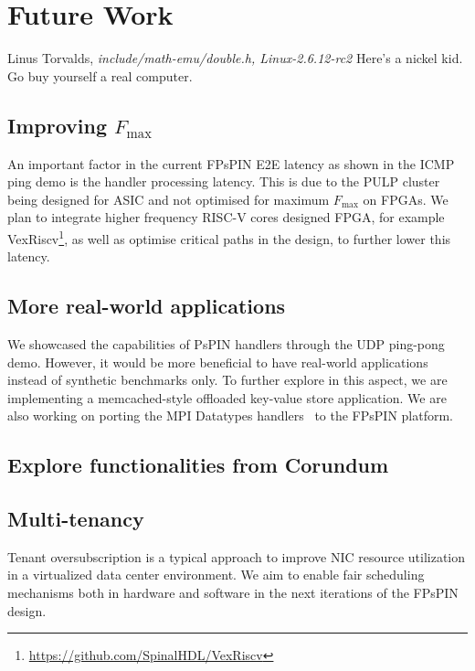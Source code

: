 \chapter{Future Work}
\begin{chapquote}{Linus Torvalds, \textit{include/math-emu/double.h, Linux-2.6.12-rc2}}
Here's a nickel kid.  Go buy yourself a real computer.
\end{chapquote}

\section{Improving $F_{\text{max}}$} \label{sec:improving-fmax}

An important factor in the current FPsPIN E2E latency as shown in the ICMP ping demo is the handler processing latency.  This is due to the PULP cluster being designed for ASIC and not optimised for maximum $F_{\text{max}}$ on FPGAs.  We plan to integrate higher frequency RISC-V cores designed FPGA, for example VexRiscv\footnote{\url{https://github.com/SpinalHDL/VexRiscv}}, as well as optimise critical paths in the design, to further lower this latency.


\section{More real-world applications}

We showcased the capabilities of PsPIN handlers through the UDP ping-pong demo.  However, it would be more beneficial to have real-world applications instead of synthetic benchmarks only.  To further explore in this aspect, we are implementing a memcached-style offloaded key-value store application.  We are also working on porting the MPI Datatypes handlers~\cite{Di_Girolamo_2019} to the FPsPIN platform.

\section{Explore functionalities from Corundum}

\section{Multi-tenancy}
Tenant oversubscription is a typical approach to improve NIC resource utilization in a virtualized data center environment. We aim to enable fair scheduling mechanisms both in hardware and software in the next iterations of the FPsPIN design.
